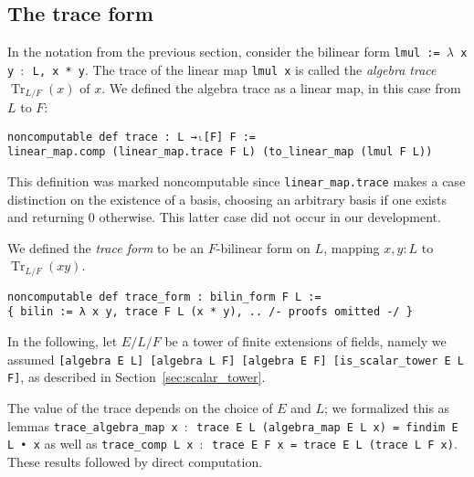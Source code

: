 \documentclass[a4paper,USenglish,cleveref, autoref, thm-restate]{lipics-v2021}
\newcommand{\lean}[1]{\texttt{#1}\xspace} %
\DeclareMathOperator{\Tr}{Tr}
\begin{document}
\subsection{The trace form}\label{sec:trace-form}
In the notation from the previous section, consider the bilinear form \lean{lmul := $\lambda$ x y $:$ L, x~*~y}.
The trace of the linear map \lean{lmul x} is called the \emph{algebra trace} $\Tr_{L / F}(x)$ of $x$.
We defined the algebra trace
as a linear map, in this case from $L$ to $F$:
\begin{lstlisting}
noncomputable def trace : L →ₗ[F] F :=
linear_map.comp (linear_map.trace F L) (to_linear_map (lmul F L))
\end{lstlisting}
This definition was marked noncomputable since \lean{linear\_map.trace} makes a case distinction on the existence of a basis,
choosing an arbitrary basis if one exists and returning $0$ otherwise.
This latter case did not occur in our development.

We defined the \emph{trace form} to be an $F$-bilinear form on $L$, mapping $x, y : L$ to $\Tr_{L/F}(xy)$.
\begin{lstlisting}
noncomputable def trace_form : bilin_form F L :=
{ bilin := λ x y, trace F L (x * y), .. /- proofs omitted -/ }
\end{lstlisting}

In the following, let $E / L / F$ be a tower of finite extensions of fields, namely we assumed \lean{[algebra E L] [algebra L F] [algebra E F] [is\_scalar\_tower E L F]}, as described in Section~\ref{sec:scalar_tower}.

The value of the trace depends on the choice of $E$ and $L$; we formalized this as lemmas \lean{trace\_algebra\_map x $:$ trace E L (algebra\_map E L x) = findim E L • x} as well as \lean{trace\_comp L x $:$ trace E F x = trace E L (trace L F x)}.
These results followed by direct computation.
\end{document}
